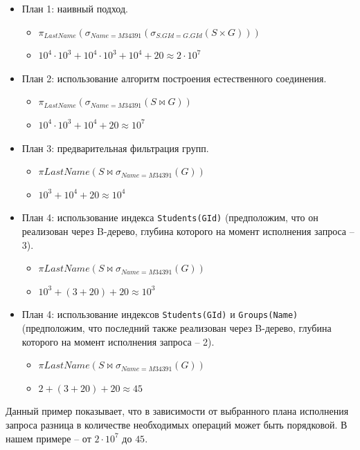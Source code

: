 \begin{itemize}
	\item План 1: наивный подход.
	      \begin{itemize}
		      \item $\pi_{LastName}(\sigma_{Name = M34391}(\sigma_{S.GId = G.GId}(S \times G)))$
		      \item $10^4 \cdot 10^3 + 10^4 \cdot 10^3 + 10^4 + 20 \approx 2 \cdot 10^7$
	      \end{itemize}
	\item План 2: использование алгоритм построения естественного соединения.
	      \begin{itemize}
		      \item $\pi_{LastName}(\sigma_{Name = M34391}(S \bowtie G))$
		      \item $10^4 \cdot 10^3 + 10^4 + 20 \approx 10^7$
	      \end{itemize}
	\item План 3: предварительная фильтрация групп.
	      \begin{itemize}
		      \item $\pi{LastName}(S \bowtie \sigma_{Name = M34391}(G))$
		      \item $10^3 + 10^4 + 20 \approx 10^4$
	      \end{itemize}
	\item План 4: использование индекса \texttt{Students(GId)} (предположим, что он реализован
	      через B-дерево, глубина которого на момент исполнения запроса -- 3).
	      \begin{itemize}
		      \item $\pi{LastName}(S \bowtie \sigma_{Name = M34391}(G))$
		      \item $10^3 + (3 + 20) + 20 \approx 10^3$
	      \end{itemize}
	\item План 4: использование индексов \texttt{Students(GId)} и \texttt{Groups(Name)}
	      (предположим, что последний также реализован через B-дерево, глубина которого на момент
	      исполнения запроса -- 2).
	      \begin{itemize}
		      \item $\pi{LastName}(S \bowtie \sigma_{Name = M34391}(G))$
		      \item $2 + (3 + 20) + 20 \approx 45$
	      \end{itemize}
\end{itemize}

Данный пример показывает, что в зависимости от выбранного плана исполнения запроса разница в
количестве необходимых операций может быть порядковой. В нашем примере -- от $2 \cdot 10^7$
до $45$.

